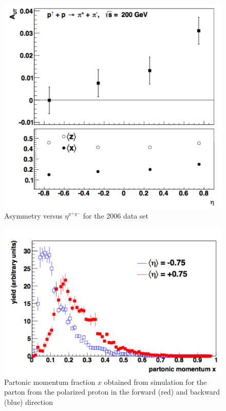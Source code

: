 \documentclass[letterpaper, abstract = on,listof=totoc, bibliography=totoc]{scrreprt}
\newcommand{\etapair}{\eta^{\pi^+\pi^-}}
\newcommand{\pip}{\pi^+}
\newcommand{\pim}{\pi^-}
\newcommand{\pair}{$\pip\pim$ }
\begin{document}
 \begin{figure}
\begin{center}
\includegraphics[width = 1\textwidth]{ansEta_new}
\caption[$A_{UT}$ vs $\etapair$ in 2006 data set]{Asymmetry versus $\etapair$ for the 2006 data set}
\label{fig:ansEta}
\end{center}
\end{figure}

 \begin{figure}
\begin{center}
\includegraphics[width = 1\textwidth]{2006SimX}
\caption[Partonic momentum fraction in 2006 simulation forward and backward \pair pair]{Partonic momentum fraction $x$ obtained from simulation for the parton from the polarized proton in the forward (red) and backward (blue) direction}
\label{fig:2006SimX}
\end{center}
\end{figure}
\end{document}
